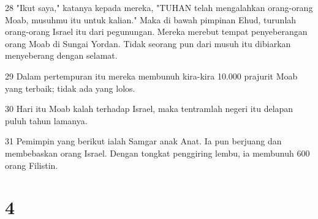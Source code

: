 \par 28 "Ikut saya," katanya kepada mereka, "TUHAN telah mengalahkan orang-orang Moab, musuhmu itu untuk kalian." Maka di bawah pimpinan Ehud, turunlah orang-orang Israel itu dari pegunungan. Mereka merebut tempat penyeberangan orang Moab di Sungai Yordan. Tidak seorang pun dari musuh itu dibiarkan menyeberang dengan selamat.
\par 29 Dalam pertempuran itu mereka membunuh kira-kira 10.000 prajurit Moab yang terbaik; tidak ada yang lolos.
\par 30 Hari itu Moab kalah terhadap Israel, maka tentramlah negeri itu delapan puluh tahun lamanya.
\par 31 Pemimpin yang berikut ialah Samgar anak Anat. Ia pun berjuang dan membebaskan orang Israel. Dengan tongkat penggiring lembu, ia membunuh 600 orang Filistin.

\chapter{4}

